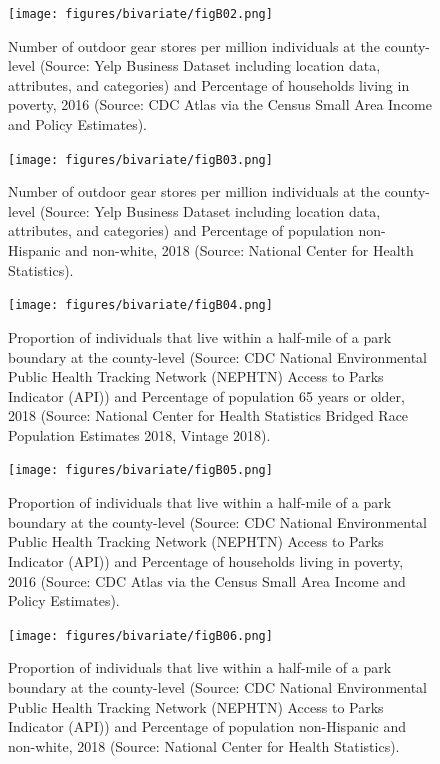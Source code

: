 \documentclass{article}
\begin{document}
\begin{figure}[!h] 
    \centering
    \caption{Number of outdoor gear stores per million individuals at the county-level (Source: Yelp Business Dataset including location data, attributes, and categories) and Percentage of households living in poverty, 2016 (Source: CDC Atlas via the Census Small Area Income and Policy Estimates).}
    \texttt{[image: figures/bivariate/figB02.png]}
    \
\end{figure}
\FloatBarrier

\begin{figure}[!h] 
    \centering
    \caption{Number of outdoor gear stores per million individuals at the county-level (Source: Yelp Business Dataset including location data, attributes, and categories) and Percentage of population non-Hispanic and non-white, 2018 (Source: National Center for Health Statistics).}
    \texttt{[image: figures/bivariate/figB03.png]}
    \
\end{figure}
\FloatBarrier

\begin{figure}[!h] 
    \centering
    \caption{Proportion of individuals that live within a half-mile of a park boundary at the county-level (Source: CDC National Environmental Public Health Tracking Network (NEPHTN) Access to Parks Indicator (API)) and Percentage of population 65 years or older, 2018 (Source: National Center for Health Statistics Bridged Race Population Estimates 2018, Vintage 2018). }
    \texttt{[image: figures/bivariate/figB04.png]}
    \
\end{figure}
\FloatBarrier

\begin{figure}[!h] 
    \centering
    \caption{Proportion of individuals that live within a half-mile of a park boundary at the county-level (Source: CDC National Environmental Public Health Tracking Network (NEPHTN) Access to Parks Indicator (API)) and Percentage of households living in poverty, 2016 (Source: CDC Atlas via the Census Small Area Income and Policy Estimates).}
    \texttt{[image: figures/bivariate/figB05.png]}
    \
\end{figure}
\FloatBarrier

\begin{figure}[!h] 
    \centering
    \caption{Proportion of individuals that live within a half-mile of a park boundary at the county-level (Source: CDC National Environmental Public Health Tracking Network (NEPHTN) Access to Parks Indicator (API)) and Percentage of population non-Hispanic and non-white, 2018 (Source: National Center for Health Statistics).}
    \texttt{[image: figures/bivariate/figB06.png]}
    \
\end{figure}
\FloatBarrier
\end{document}
